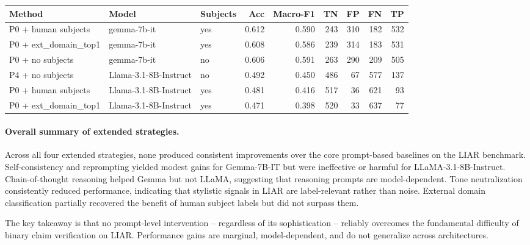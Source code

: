\begin{minipage}{\linewidth}
\centering
{}
\label{tab:top_extdomain}
\scriptsize
\begin{tabular}{l l l r r r r r r}
\toprule
Method & Model & Subjects & Acc & Macro-F1 & TN & FP & FN & TP \\
\midrule
P0 + human subjects    & gemma-7b-it           & yes & 0.612 & 0.590 & 243 & 310 & 182 & 532 \\
P0 + ext\_domain\_top1 & gemma-7b-it           & yes & 0.608 & 0.586 & 239 & 314 & 183 & 531 \\
P0 + no subjects       & gemma-7b-it           & no  & 0.606 & 0.591 & 263 & 290 & 209 & 505 \\
\addlinespace
P4 + no subjects       & Llama-3.1-8B-Instruct & no  & 0.492 & 0.450 & 486 &  67 & 577 & 137 \\
P0 + human subjects    & Llama-3.1-8B-Instruct & yes & 0.481 & 0.416 & 517 &  36 & 621 &  93 \\
P0 + ext\_domain\_top1 & Llama-3.1-8B-Instruct & yes & 0.471 & 0.398 & 520 &  33 & 637 &  77 \\
\bottomrule
\end{tabular}
\end{minipage}

\paragraph{Overall summary of extended strategies.}

Across all four extended strategies, none produced consistent improvements over the core prompt-based baselines on the LIAR benchmark. Self-consistency and reprompting yielded modest gains for Gemma-7B-IT but were ineffective or harmful for LLaMA-3.1-8B-Instruct. Chain-of-thought reasoning helped Gemma but not LLaMA, suggesting that reasoning prompts are model-dependent. Tone neutralization consistently reduced performance, indicating that stylistic signals in LIAR are label-relevant rather than noise. External domain classification partially recovered the benefit of human subject labels but did not surpass them.

The key takeaway is that no prompt-level intervention -- regardless of its sophistication -- reliably overcomes the fundamental difficulty of binary claim verification on LIAR. Performance gains are marginal, model-dependent, and do not generalize across architectures.

